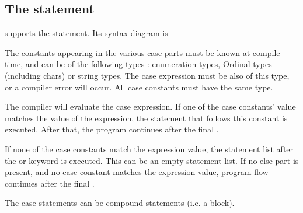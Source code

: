 \subsection{The  statement}
\fpc supports the  statement. Its syntax diagram is

The constants appearing in the various case parts must be known at
compile-time, and can be of the following types : enumeration types,
Ordinal types (including chars) or string types. 
The case expression must be also of this type, or a compiler error 
will occur. All case constants must have the same type.

The compiler will evaluate the case expression. If one of the case
constants' value matches the value of the expression, the statement that follows
this constant is executed. After that, the program continues after the final
.  

If none of the case constants match the expression value, the statement
list after the   or  
keyword is executed. This can be an empty statement list.
If no else part is present, and no case constant matches the expression
value, program flow continues after the final .

The case statements can be compound statements (i.e. a  block).

